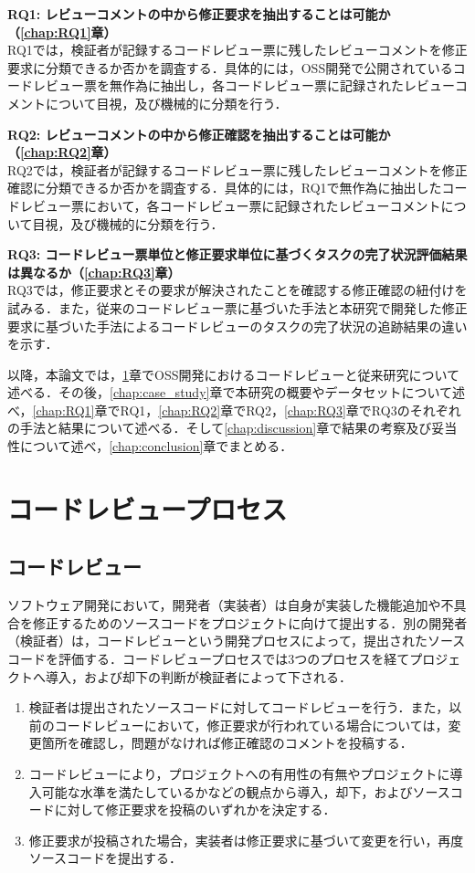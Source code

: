\documentclass[11pt]{jreport}
\newcommand{\RQOne}{レビューコメントの中から修正要求を抽出することは可能か}
\newcommand{\RQTwo}{レビューコメントの中から修正確認を抽出することは可能か}
\newcommand{\RQThree}{コードレビュー票単位と修正要求単位に基づくタスクの完了状況評価結果は異なるか}
\begin{document}
\noindent\textbf{RQ1: \RQOne （\ref{chap:RQ1}章）}\\
RQ1では，検証者が記録するコードレビュー票に残したレビューコメントを修正要求に分類できるか否かを調査する．具体的には，OSS開発で公開されているコードレビュー票を無作為に抽出し，各コードレビュー票に記録されたレビューコメントについて目視，及び機械的に分類を行う．

\noindent\textbf{RQ2: \RQTwo （\ref{chap:RQ2}章）}\\
RQ2では，検証者が記録するコードレビュー票に残したレビューコメントを修正確認に分類できるか否かを調査する．具体的には，RQ1で無作為に抽出したコードレビュー票において，各コードレビュー票に記録されたレビューコメントについて目視，及び機械的に分類を行う．

\noindent\textbf{RQ3: \RQThree （\ref{chap:RQ3}章）}\\
RQ3では，修正要求とその要求が解決されたことを確認する修正確認の紐付けを試みる．また，従来のコードレビュー票に基づいた手法と本研究で開発した修正要求に基づいた手法によるコードレビューのタスクの完了状況の追跡結果の違いを示す．

以降，本論文では，\ref{chap:review_process}章でOSS開発におけるコードレビューと従来研究について述べる．その後，\ref{chap:case_study}章で本研究の概要やデータセットについて述べ，\ref{chap:RQ1}章でRQ1，\ref{chap:RQ2}章でRQ2，\ref{chap:RQ3}章でRQ3のそれぞれの手法と結果について述べる．そして\ref{chap:discussion}章で結果の考察及び妥当性について述べ，\ref{chap:conclusion}章でまとめる．

\chapter{コードレビュープロセス}\label{chap:review_process}

\section{コードレビュー}
ソフトウェア開発において，開発者（実装者）は自身が実装した機能追加や不具合を修正するためのソースコードをプロジェクトに向けて提出する．別の開発者（検証者）は，コードレビューという開発プロセスによって，提出されたソースコードを評価する．コードレビュープロセスでは3つのプロセスを経てプロジェクトへ導入，および却下の判断が検証者によって下される．

\begin{enumerate}[label=\textbf{ステップ\arabic*:}, leftmargin=75pt]
\item 検証者は提出されたソースコードに対してコードレビューを行う．また，以前のコードレビューにおいて，修正要求が行われている場合については，変更箇所を確認し，問題がなければ修正確認のコメントを投稿する．
\item コードレビューにより，プロジェクトへの有用性の有無やプロジェクトに導入可能な水準を満たしているかなどの観点から導入，却下，およびソースコードに対して修正要求を投稿のいずれかを決定する．
\item 修正要求が投稿された場合，実装者は修正要求に基づいて変更を行い，再度ソースコードを提出する．
\end{enumerate}
\end{document}
